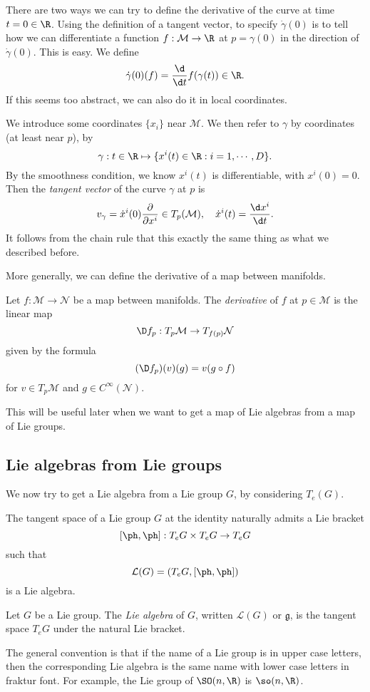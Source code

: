 \documentclass[a4paper]{article}
\begin{document}
There are two ways we can try to define the derivative of the curve at time $t = 0 \in \R$. Using the definition of a tangent vector, to specify $\dot{\gamma}(0)$ is to tell how we can differentiate a function $f: \mathcal{M} \to \R$ at $p = \gamma(0)$ in the direction of $\dot{\gamma}(0)$. This is easy. We define
\[
  \dot{\gamma}(0)(f) = \frac{\d}{\d t} f(\gamma(t)) \in \R.
\]
If this seems too abstract, we can also do it in local coordinates.

We introduce some coordinates $\{x_i\}$ near $\mathcal{M}$. We then refer to $\gamma$ by coordinates (at least near $p$), by
\[
  \gamma: t \in \R \mapsto \{x^i(t) \in \R: i = 1, \cdots, D\}.
\]
By the smoothness condition, we know $x^i(t)$ is differentiable, with $x^i(0) = 0$. Then the \emph{tangent vector} of the curve $\gamma$ at $p$ is
\[
  v_\gamma = \dot{x}^i(0) \frac{\partial}{\partial x^i} \in T_p (\mathcal{M}),\quad \dot{x}^i(t) = \frac{\d x^i}{\d t}.
\]
It follows from the chain rule that this exactly the same thing as what we described before.

More generally, we can define the derivative of a map between manifolds.
\begin{defi}[Derivative]
  Let $f: \mathcal{M} \to \mathcal{N}$ be a map between manifolds. The \emph{derivative} of $f$ at $p \in \mathcal{M}$ is the linear map
  \[
    \D f_p: T_p \mathcal{M} \to T_{f(p)} \mathcal{N}
  \]
  given by the formula
  \[
    (\D f_p)(v)(g) = v(g \circ f)
  \]
  for $v \in T_p \mathcal{M}$ and $g \in C^\infty(\mathcal{N})$.
\end{defi}
This will be useful later when we want to get a map of Lie algebras from a map of Lie groups.

\subsection{Lie algebras from Lie groups}
We now try to get a Lie algebra from a Lie group $G$, by considering $T_e(G)$.

\begin{thm}
  The tangent space of a Lie group $G$ at the identity naturally admits a Lie bracket
  \[
    [\ph, \ph]: T_e G \times T_e G \to T_e G
  \]
  such that
  \[
    \mathcal{L}(G) = (T_e G, [\ph, \ph])
  \]
  is a Lie algebra.
\end{thm}

\begin{defi}
  Let $G$ be a Lie group. The \emph{Lie algebra} of $G$, written $\mathcal{L}(G)$ or $\mathfrak{g}$, is the tangent space $T_e G$ under the natural Lie bracket.
\end{defi}
The general convention is that if the name of a Lie group is in upper case letters, then the corresponding Lie algebra is the same name with lower case letters in fraktur font. For example, the Lie group of $\SO(n, \R)$ is $\so(n, \R)$.
\end{document}
